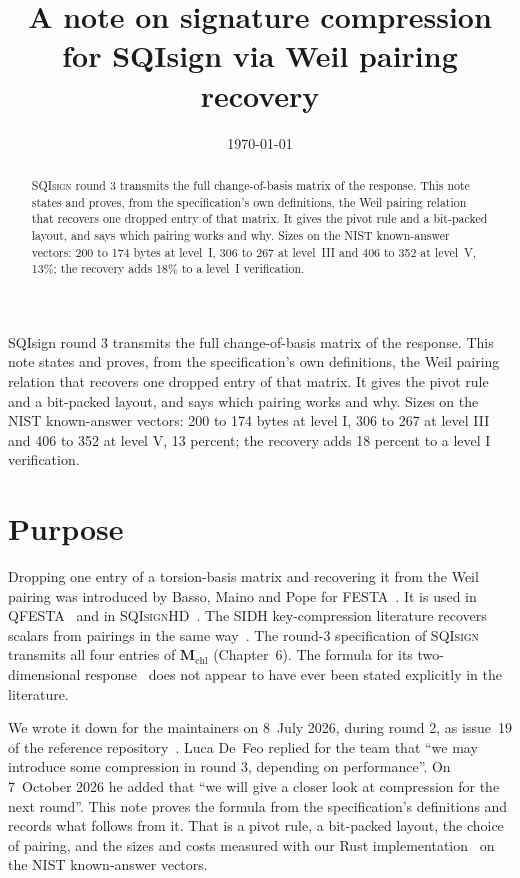 \documentclass[version=preprint,notanonymous]{iacrcc}
\title{A note on signature compression for {SQIsign} via Weil pairing recovery}
\date{\today}
\newcommand{\Mm}{\mathbf{M}}
\newcommand{\SQIsign}{{SQI}\textsc{sign}}
\begin{document}
\maketitle

\begin{abstract}
{\SQIsign} round 3 transmits the full change-of-basis matrix of the
response. This note states and proves, from the specification's own
definitions, the Weil pairing relation that recovers one dropped entry of
that matrix. It gives the pivot rule and a bit-packed layout, and says
which pairing works and why. Sizes on the NIST known-answer vectors: 200
to 174 bytes at level~I, 306 to 267 at level~III and 406 to 352 at
level~V, 13\%; the recovery adds 18\% to a level~I verification.
\end{abstract}

\begin{textabstract}
SQIsign round 3 transmits the full change-of-basis matrix of the
response. This note states and proves, from the specification's own
definitions, the Weil pairing relation that recovers one dropped entry of
that matrix. It gives the pivot rule and a bit-packed layout, and says
which pairing works and why. Sizes on the NIST known-answer vectors: 200
to 174 bytes at level I, 306 to 267 at level III and 406 to 352 at level
V, 13 percent; the recovery adds 18 percent to a level I verification.
\end{textabstract}

\section{Purpose}
\label{sec:purpose}

Dropping one entry of a torsion-basis matrix and recovering it from the
Weil pairing was introduced by Basso, Maino and Pope for
FESTA~\cite{festa}. It is used in QFESTA~\cite{qfesta} and in
{\SQIsign}HD~\cite{sqisignhd}. The SIDH key-compression literature
recovers scalars from pairings in the same
way~\cite{costello-compression,zanon2018,pereira-barreto}. The round-3
specification of {\SQIsign}~\cite{sqisign-spec-r3} transmits all four
entries of $\Mm_{\mathrm{chl}}$ (Chapter~6).
The formula for its two-dimensional response~\cite{sqisign2d-west} does not appear to have ever been stated explicitly in the literature.

We wrote it down for the maintainers on 8~July 2026, during round 2, as
issue~19 of the reference repository~\cite{issue19}. Luca De~Feo replied
for the team that ``we may introduce some compression in round 3,
depending on performance''. On 7~October 2026 he added that ``we will give
a closer look at compression for the next round''. This note proves the
formula from the specification's definitions and records what follows
from it. That is a pivot rule, a bit-packed layout, the choice of pairing,
and the sizes and costs measured with our Rust
implementation~\cite{sqisign-rs} on the NIST known-answer vectors.
\end{document}
